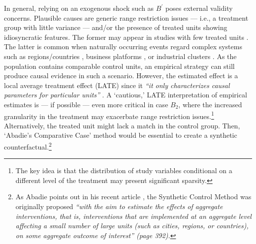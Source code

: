 \documentclass[11pt]{article}
\begin{document}
\begin{refsection}
In general, relying on an exogenous shock such as $B^{'}$ poses external validity concerns. Plausible causes are generic range restriction issues --- i.e., a treatment group with little variance --- and/or the presence of treated units showing idiosyncratic features. The former may appear in studies with few treated units \autocite[e.g.,][]{aizenam_kletzer_2011}.  The latter is common when naturally occurring events regard complex systems such as regions/countries \autocite[e.g.,][]{abadie_gardeazabal_2003}, business platforms \autocite[e.g.,][]{zhang2020}, or industrial clusters  \autocite[e.g.,][]{nathan_2020}. As the population contains comparable control units, an empirical strategy can still produce causal evidence in such a scenario. However, the estimated effect is a local average treatment effect (LATE) \autocite{imbens_2009} since it \textit{``it only characterizes causal parameters for particular units''} \autocite[][page 290]{dunning_2012}. A `cautious,' LATE interpretation of empirical estimates is --- if possible --- even more critical in case $B_{2}$, where the increased granularity in the treatment may exacerbate range restriction issues.\footnote{The key idea is that the distribution of study variables conditional on a different level of the treatment may present significant sparsity.} Alternatively, the treated unit might lack a match in the control group. Then, `Abadie's Comparative Case' method  \autocite{abadie_gardeazabal_2003,abadie_2021,abadie_et_al_2010,abadie_et_al_2015}  would be essential to create a synthetic counterfactual.\footnote{As Abadie points out in his recent article \autocite*{abadie_2021}, the Synthetic Control Method was originally proposed \textit{``with the aim to estimate the effects of aggregate interventions, that is, interventions that are implemented at an aggregate level affecting a small number of large units (such as cities, regions, or countries), on some aggregate outcome of interest'' (page 392).}}


\end{refsection}
\end{document}
